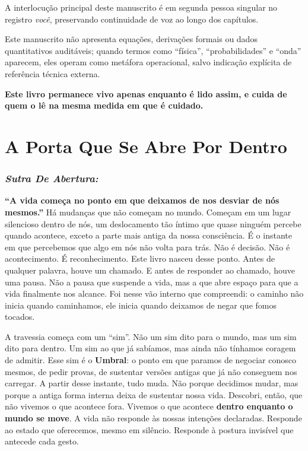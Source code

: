 \documentclass[12pt]{book}
\begin{document}
A interlocução principal deste manuscrito é em segunda pessoa singular no registro \textit{você}, preservando continuidade de voz ao longo dos capítulos.

Este manuscrito não apresenta equações, derivações formais ou dados quantitativos auditáveis; quando termos como \enquote{física}, \enquote{probabilidades} e \enquote{onda} aparecem, eles operam como metáfora operacional, salvo indicação explícita de referência técnica externa.

\textbf{Este livro permanece vivo apenas enquanto é lido assim, e cuida de quem o lê na mesma medida em que é cuidado.}

\chapter{A Porta Que Se Abre Por Dentro}

\subsection*{\textit{Sutra De Abertura:}}

\textbf{\enquote{A vida começa no ponto em que deixamos de nos desviar de nós mesmos.}} Há mudanças que não começam no mundo. Começam em um lugar silencioso dentro de nós, um deslocamento tão íntimo que quase ninguém percebe quando acontece, exceto a parte mais antiga da nossa consciência. É o instante em que percebemos que algo em nós não volta para trás. Não é decisão. Não é acontecimento. É reconhecimento. Este livro nasceu desse ponto. Antes de qualquer palavra, houve um chamado. E antes de responder ao chamado, houve uma pausa. Não a pausa que suspende a vida, mas a que abre espaço para que a vida finalmente nos alcance. Foi nesse vão interno que compreendi: o caminho não inicia quando caminhamos, ele inicia quando deixamos de negar que fomos tocados.

A travessia começa com um \enquote{sim}. Não um sim dito para o mundo, mas um sim dito para dentro. Um sim ao que já sabíamos, mas ainda não tínhamos coragem de admitir. Esse sim é o \textbf{Umbral}: o ponto em que paramos de negociar conosco mesmos, de pedir provas, de sustentar versões antigas que já não conseguem nos carregar. A partir desse instante, tudo muda. Não porque decidimos mudar, mas porque a antiga forma interna deixa de sustentar nossa vida. Descobri, então, que não vivemos o que acontece fora. Vivemos o que acontece \textbf{dentro enquanto o mundo se move}. A vida não responde às nossas intenções declaradas. Responde ao estado que oferecemos, mesmo em silêncio. Responde à postura invisível que antecede cada gesto.
\end{document}
